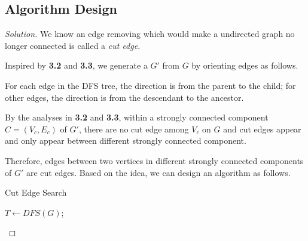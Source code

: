 \documentclass{article}
\newenvironment{solution}{\begin{proof}[\noindent\it Solution]}{\end{proof}}
\begin{document}
\subsection{Algorithm Design}
\vspace{1em}
\begin{solution}
    We know an edge removing which would make a undirected graph no longer connected is called a \textit{cut edge}.
    
    \hspace{2.6em}
    Inspired by \textbf{3.2} and \textbf{3.3}, we  generate a $G'$ from $G$ by orienting edges as follows.
    
    \hspace{2.6em}
    For each edge in the DFS tree, the direction is from the parent to the child; for other edges, the direction is from the descendant to the ancestor.
    
    \hspace{2.6em}
    By the analyses in \textbf{3.2} and \textbf{3.3}, within a strongly connected component $C=(V_c,E_c)$ of $G'$, there are no cut edge among $V_c$ on $G$ and cut edges appear and only appear between different strongly connected component. 
    
    \hspace{2.6em}
    Therefore, edges between two vertices in different strongly connected components of $G'$ are cut edges. Based on the idea, we can design an algorithm as follows.
    
    \begin{algorithm}
        \caption{Cut Edge Search}
	    
	    {
	        $T\gets DFS(G)$; \qquad\qquad\qquad\qquad\qquad\qquad\qquad\qquad\qquad\qquad\quad{}
	        \qquad\qquad\quad{}
	    }
	    \BlankLine
	    \BlankLine
	    \BlankLine
    \end{algorithm}
    

\end{solution}
\end{document}
